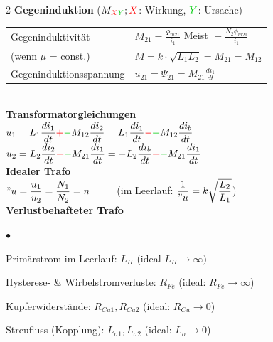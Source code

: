 \begin{multicols}{2}
 		\textbf{Gegeninduktion} ($M_{\textcolor{red}{X}\textcolor{green}{Y}}; \textcolor{red}{X}$: Wirkung,
 		$\textcolor{green}{Y}$: Ursache)\\
		\begin{tabular}{ll}
  		Gegeninduktivit\"at
  			& $M_{21} = \frac{\Psi_{m21}}{i_1}$ Meist $= \frac{N_2 \phi_{m21}}{i_1}$\\ 
  			(wenn $\mu$ = const.) & $M = k \cdot \sqrt{L_1 L_2} = M_{21} = M_{12} $  \\
  			Gegeninduktionsspannung
  			& $u_{21} = \dot{\Psi}_{21} = M_{21} \frac{di_1}{dt}$ \\
		\end{tabular}\\

  		\textbf{Transformatorgleichungen}\\
		$u_1 = L_1 \dfrac{di_1}{dt} \textcolor{red}{+}\textcolor{green}{-}M_{12}
		\dfrac{di_2}{dt} = L_1 \dfrac{di_1}{dt} \textcolor{red}{-}\textcolor{green}{+}M_{12} \dfrac{di_b}{dt}$ \\
		$u_2 = L_2 \dfrac{di_2}{dt}\textcolor{red}{+}\textcolor{green}{-} M_{21}
		\dfrac{d i_1}{dt} = -L_2 \dfrac{di_b}{dt}
		\textcolor{red}{+}\textcolor{green}{-} M_{21} \dfrac{d i_1}{dt}$\\
  			
	  	\textbf{Idealer Trafo}\\ 
	  	$"u = \dfrac{u_1}{u_2} = \dfrac{N_1}{N_2} = n$ $\qquad$ (im Leerlauf:
	  	$\dfrac{1}{"u} = k \sqrt{\dfrac{L_2}{L_1}}$)\\

  		\textbf{Verlustbehafteter Trafo}
  		\begin{list}{$\bullet$}{\setlength{\itemsep}{0cm} \setlength{\parsep}{0cm} \setlength{\topsep}{0cm}} 
          \item Prim\"arstrom im Leerlauf: $L_H$
          	(ideal $L_H \rightarrow \infty)$
          \item Hysterese- \& Wirbelstromverluste: $R_{Fe}$ \newline
          	(ideal: $R_{Fe}\rightarrow \infty$) 
          \item Kupferwiderst\"ande: $R_{Cu1}, R_{Cu2}$
          	(ideal: $R_{Cu}
          \rightarrow 0$)
          \item Streufluss (Kopplung): $L_{\sigma1}, L_{\sigma2}$
          	(ideal: $L_{\sigma} \rightarrow 0$)
        \end{list}


\end{multicols}
